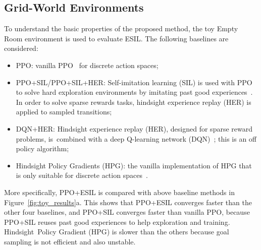 \subsection{Grid-World Environments}
To understand the basic properties of the proposed method, the toy Empty Room environment is used to evaluate ESIL.
The following baselines are considered:
\begin{itemize}
    \item PPO: vanilla PPO~\cite{schulman2017proximal} for discrete action spaces;
    \item PPO+SIL/PPO+SIL+HER: Self-imitation learning (SIL) is used with PPO to solve hard exploration environments by imitating past good experiences~\cite{oh2018self}. In order to solve sparse rewards tasks, hindsight experience replay (HER) is applied to sampled transitions;
    \item DQN+HER: Hindsight experience replay (HER), designed for sparse reward problems, is~combined with a deep Q-learning network (DQN)~\cite{andrychowicz2017hindsight}; this is an off policy algorithm;
    \item Hindsight Policy Gradients (HPG): the vanilla implementation of HPG that is only suitable for discrete action spaces~\cite{rauber2018hindsight}.
\end{itemize}
More specifically, {PPO+ESIL is compared with above baseline methods} in Figure~\ref{fig:toy_results}a. This shows that PPO+ESIL converges faster than the other four baselines, and PPO+SIL converges faster than vanilla PPO, because PPO+SIL reuses past good experiences to help exploration and training. Hindsight~Policy Gradient (HPG) is slower than the others because goal sampling is not efficient and also unstable. 
